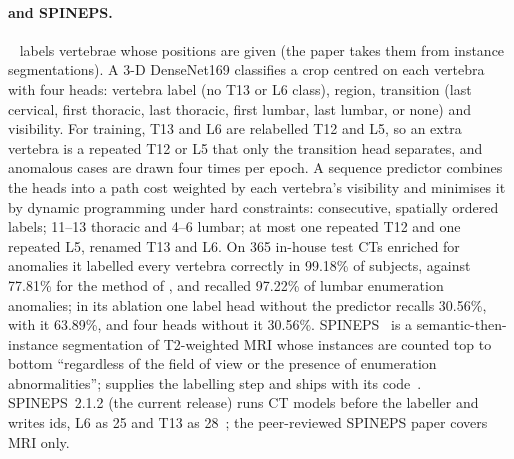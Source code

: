 \paragraph{\VERIDAH{} and SPINEPS.}
\VERIDAH{}~\citep{Moller2026VERIDAH:Sequences} labels vertebrae whose positions are given
(the paper takes them from instance segmentations). A 3-D DenseNet169 classifies a crop
centred on each vertebra with four heads: vertebra label (no T13 or L6 class), region,
transition (last cervical, first thoracic, last thoracic, first lumbar, last lumbar, or none)
and visibility. For training, T13 and L6 are relabelled T12 and L5, so an extra vertebra is a repeated T12 or L5 that only the transition
head separates, and anomalous cases are drawn four times per epoch. A sequence predictor
combines the heads into a path cost weighted by each vertebra's visibility and minimises it by
dynamic programming under hard constraints: consecutive, spatially ordered labels; 11--13
thoracic and 4--6 lumbar; at most one repeated T12 and one repeated L5, renamed T13 and L6.
On 365 in-house test CTs enriched for anomalies it labelled every vertebra correctly in
99.18\% of subjects, against 77.81\% for the method of \citet{Meng2022VertebraeMLMI}, and
recalled 97.22\% of lumbar enumeration anomalies; in its ablation one label head without the
predictor recalls 30.56\%, with it 63.89\%, and four heads without it 30.56\%.
SPINEPS~\citep{Moller2024SPINEPSautomaticSegmentation} is a semantic-then-instance
segmentation of T2-weighted MRI whose instances are counted top to bottom ``regardless of the
field of view or the presence of enumeration abnormalities''; \VERIDAH{} supplies the
labelling step and ships with its code~\citep{Moller2026VERIDAH:Sequences}. SPINEPS~2.1.2
(the current release) runs CT models before the \VERIDAH{} labeller and writes \VerSe{}
ids, L6 as 25 and T13 as 28~\citep{MollerSPINEPSSoftware}; the peer-reviewed SPINEPS paper
covers MRI only.

